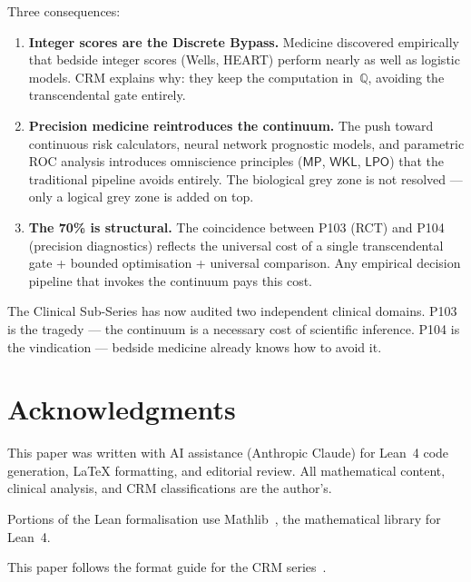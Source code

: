 \documentclass[11pt,a4paper]{article}
\theoremstyle{plain}
\theoremstyle{definition}
\newcommand{\WKL}{\textsf{WKL}}
\newcommand{\LPO}{\textsf{LPO}}
\newcommand{\MP}{\textsf{MP}}
\newcommand{\Q}{\mathbb{Q}}
\begin{document}
Three consequences:
\begin{enumerate}[nosep]
\item \textbf{Integer scores are the Discrete Bypass.}  Medicine discovered empirically that bedside integer scores (Wells, HEART) perform nearly as well as logistic models.  CRM explains why: they keep the computation in~$\Q$, avoiding the transcendental gate entirely.
\item \textbf{Precision medicine reintroduces the continuum.}  The push toward continuous risk calculators, neural network prognostic models, and parametric ROC analysis introduces omniscience principles ($\MP$, $\WKL$, $\LPO$) that the traditional pipeline avoids entirely.  The biological grey zone is not resolved --- only a logical grey zone is added on top.
\item \textbf{The 70\% is structural.}  The coincidence between P103 (RCT) and P104 (precision diagnostics) reflects the universal cost of a single transcendental gate + bounded optimisation + universal comparison.  Any empirical decision pipeline that invokes the continuum pays this cost.
\end{enumerate}

The Clinical Sub-Series has now audited two independent clinical domains.  P103 is the tragedy --- the continuum is a necessary cost of scientific inference.  P104 is the vindication --- bedside medicine already knows how to avoid it.

\section*{Acknowledgments}

This paper was written with AI assistance (Anthropic Claude) for Lean~4 code generation, LaTeX formatting, and editorial review.  All mathematical content, clinical analysis, and CRM classifications are the author's.

Portions of the Lean formalisation use Mathlib~\cite{mathlib}, the mathematical library for Lean~4.

This paper follows the format guide for the CRM series~\cite{lee-format-guide}.
\end{document}
